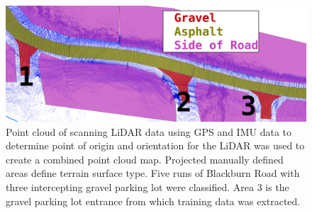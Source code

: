 \documentclass[balance,upint,subscriptcorrection,varvw,mathalfa=cal=boondoxo,colorlinks]{asmeconf}
\begin{document}
	\begin{figure}
		\centering
		\includegraphics[width=0.95\linewidth]{figures/road_areas_annotated_22}
		\caption[Compiled and Manually Classified Point Cloud Data]{Point cloud of scanning LiDAR data using GPS and IMU data to determine point of origin and orientation for the LiDAR was used to create a combined point cloud map. Projected manually defined areas define terrain surface type. Five runs of Blackburn Road with three intercepting gravel parking lot were classified. Area $3$ is the gravel parking lot entrance from which training data was extracted.}
		\label{fig:road_areas_annotated_22}
	\end{figure}
		
	
\end{document}
